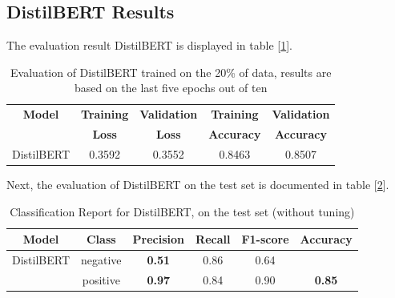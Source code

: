 \documentclass[11pt]{article}
\begin{document}
\subsection{DistilBERT Results}
The evaluation result DistilBERT is displayed in table [\ref{tab:bert_eval}].
 \begin{table}
 \scriptsize
     \centering
     \begin{tabular}{c c c c c} 
     \hline 
        \textbf{Model}  & \textbf{Training} & \textbf{Validation} & \textbf{Training} & \textbf{Validation} \\
        & \textbf{Loss} & \textbf{Loss} & \textbf{Accuracy}& \textbf{Accuracy}\\
        \hline 
     DistilBERT & 0.3592 &0.3552& 0.8463  & 0.8507\\\hline 
     \end{tabular}
     \caption{Evaluation of DistilBERT trained on the 20\% of data, results are based on the last five epochs out of ten}
     \label{tab:bert_eval}
 \end{table}
 Next, the evaluation of DistilBERT on the test set is documented in table [\ref{tab:bert_distil_class_report}].
\begin{table}
\scriptsize
    \centering
    \begin{tabular}{c c c c c c}
    \hline
  \textbf{Model}& \textbf{Class} & \textbf{Precision} &  \textbf{Recall} & \textbf{F1-score}  & \textbf{Accuracy}  \\ 
 \hline 
 DistilBERT & negative &\textbf{0.51} &0.86 &0.64  \\
         & positive& \textbf{0.97}&0.84 &0.90&\textbf{0.85}\\  
         \hline 
        \end{tabular}
    \caption{Classification Report for DistilBERT, on the test set (without tuning)}
    \label{tab:bert_distil_class_report}
\end{table}
\end{document}
